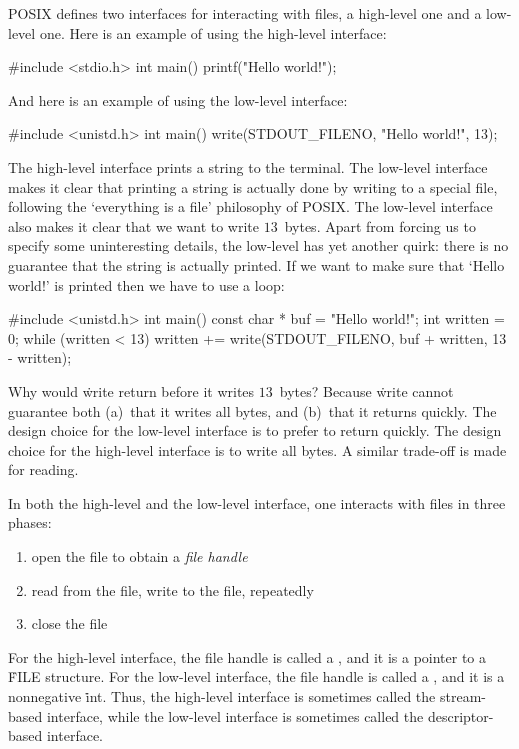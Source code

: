 POSIX defines two interfaces for interacting with files,
  a high-level one and a low-level one.
Here is an example of using the high-level interface:
\begin{ccode}
#include <stdio.h>
int main() {
  printf("Hello world!\n");
}
\end{ccode}
And here is an example of using the low-level interface:
\begin{ccode}
#include <unistd.h>
int main() {
  write(STDOUT_FILENO, "Hello world!\n", 13);
}
\end{ccode}
The high-level interface prints a string to the terminal.
The low-level interface makes it clear that printing a string
  is actually done by writing to a special file,
  following the `everything is a file' philosophy of POSIX\null.
The low-level interface also makes it clear that we want to write $13$~bytes.
Apart from forcing us to specify some uninteresting details,
  the low-level has yet another quirk:
  there is no guarantee that the string is actually printed.
If we want to make sure that `Hello world!' is printed then we have to use a loop:
\begin{ccode}
#include <unistd.h>
int main() {
  const char * buf = "Hello world!\n";
  int written = 0;
  while (written < 13) {
    written += write(STDOUT_FILENO, buf + written, 13 - written);
  }
}
\end{ccode}
Why would \.{write} return before it writes $13$~bytes?
Because \.{write} cannot guarantee both
  (a)~that it writes all bytes, and
  (b)~that it returns quickly.
The design choice for the low-level interface is to prefer to return quickly.
The design choice for the high-level interface is to write all bytes.
A similar trade-off is made for reading.

In both the high-level and the low-level interface,
  one interacts with files in three phases:
\begin{enumerate}
\item open the file to obtain a \emph{file handle}
\item read from the file, write to the file, repeatedly
\item close the file
\end{enumerate}
For the high-level interface, the file handle is called a ,
  and it is a pointer to a \.{FILE} structure.
For the low-level interface, the file handle is called a ,
  and it is a nonnegative \.{int}.
Thus, the high-level interface is sometimes called the stream-based interface,
  while the low-level interface is sometimes called the descriptor-based interface.

